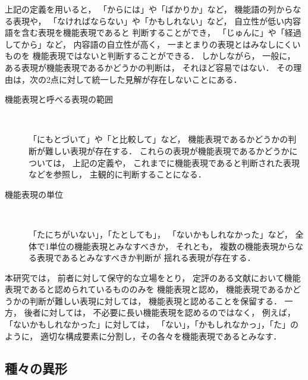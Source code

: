 \documentclass[japanese]{jnlp_1.3e}
\begin{document}
上記の定義を用いると，
「からには」や「ばかりか」など，
機能語の列からなる表現や，
「なければならない」や「かもしれない」など，
自立性が低い内容語を含む表現を機能表現であると
判断することができ，
「じゅんに」や「経過してから」など，
内容語の自立性が高く，
一まとまりの表現とはみなしにくいものを
機能表現ではないと判断することができる．
しかしながら，
一般に，
ある表現が機能表現であるかどうかの判断は，
それほど容易ではない．
その理由は，次の2点に対して統一した見解が存在しないことにある．
\begin{description}
\item[機能表現と呼べる表現の範囲] ~~

      「にもとづいて」や「と比較して」など，
      機能表現であるかどうかの判断が難しい表現が存在する．
      これらの表現が機能表現であるかどうかについては，
      上記の定義や，
      これまでに機能表現であると判断された表現などを参照し，
      主観的に判断することになる．

\item[機能表現の単位] ~~

      「たにちがいない」，「たとしても」，
      「ないかもしれなかった」など，
      全体で1単位の機能表現とみなすべきか，
      それとも，
      複数の機能表現からなる表現であるとみなすべきか判断が
      揺れる表現が存在する．
\end{description}
本研究では，
前者に対して保守的な立場をとり，
定評のある文献において機能表現であると認められているもののみを
機能表現と認め，
機能表現であるかどうかの判断が難しい表現に対しては，
機能表現と認めることを保留する．
一方，
後者に対しては，
不必要に長い機能表現を認めるのではなく，
例えば，「ないかもしれなかった」に対しては，
「ない」，「かもしれなかっ」，「た」のように，
適切な構成要素に分割し，その各々を機能表現であるとみなす．

\subsection{種々の異形}
\label{subsec:variety}
\end{document}
